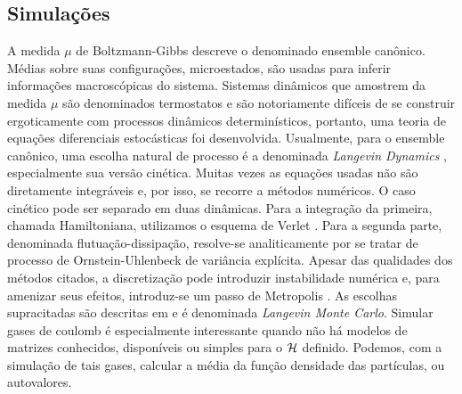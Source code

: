 \documentclass[12pt]{report}
\begin{document}
\subsection{Simulações}
A medida $\mu$ de Boltzmann-Gibbs descreve o denominado ensemble canônico. Médias sobre suas configurações, microestados, são usadas para inferir informações macroscópicas do sistema. Sistemas dinâmicos que amostrem da medida $\mu$ são denominados termostatos e são notoriamente difíceis de se construir ergoticamente com processos dinâmicos determinísticos, portanto, uma teoria de equações diferenciais estocásticas foi desenvolvida. Usualmente, para o ensemble canônico, uma escolha natural de processo é a denominada \textit{Langevin Dynamics} \cite[Capítulo~6]{leimmolecular}, especialmente sua versão cinética. Muitas vezes as equações usadas não são diretamente integráveis e, por isso, se recorre a métodos numéricos. O caso cinético pode ser separado em duas dinâmicas. Para a integração da primeira, chamada Hamiltoniana, utilizamos o esquema de Verlet \cite{Verlet}. Para a segunda parte, denominada flutuação-dissipação, resolve-se analiticamente por se tratar de processo de Ornstein-Uhlenbeck de variância explícita. Apesar das qualidades dos métodos citados, a discretização pode introduzir instabilidade numérica e, para amenizar seus efeitos, introduz-se um passo de Metropolis \cite[Apêndice~C]{leimmolecular}. As escolhas supracitadas são descritas em \cite{Chafa2018} e é denominada \textit{Langevin Monte Carlo}. Simular gases de coulomb é especialmente interessante quando não há modelos de matrizes conhecidos, disponíveis ou simples para o $\operatorname{\mathcal{H}}$ definido. Podemos, com a simulação de tais gases, calcular a média da função densidade das partículas, ou autovalores.
\end{document}

